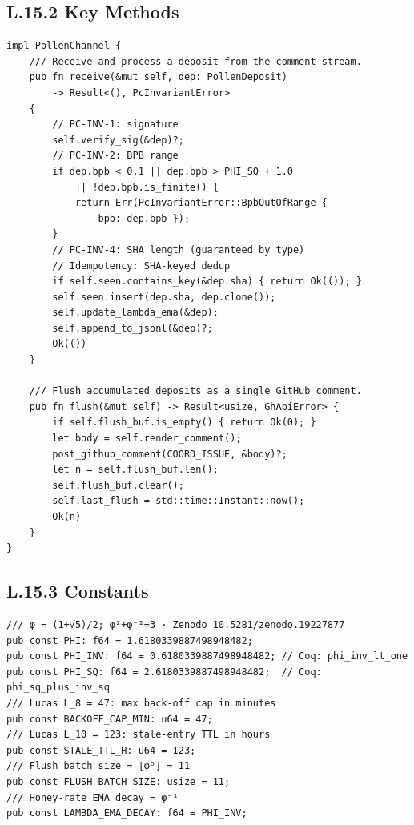 \subsection*{L.15.2 \quad Key Methods}

\begin{verbatim}
impl PollenChannel {
    /// Receive and process a deposit from the comment stream.
    pub fn receive(&mut self, dep: PollenDeposit)
        -> Result<(), PcInvariantError>
    {
        // PC-INV-1: signature
        self.verify_sig(&dep)?;
        // PC-INV-2: BPB range
        if dep.bpb < 0.1 || dep.bpb > PHI_SQ + 1.0
            || !dep.bpb.is_finite() {
            return Err(PcInvariantError::BpbOutOfRange {
                bpb: dep.bpb });
        }
        // PC-INV-4: SHA length (guaranteed by type)
        // Idempotency: SHA-keyed dedup
        if self.seen.contains_key(&dep.sha) { return Ok(()); }
        self.seen.insert(dep.sha, dep.clone());
        self.update_lambda_ema(&dep);
        self.append_to_jsonl(&dep)?;
        Ok(())
    }

    /// Flush accumulated deposits as a single GitHub comment.
    pub fn flush(&mut self) -> Result<usize, GhApiError> {
        if self.flush_buf.is_empty() { return Ok(0); }
        let body = self.render_comment();
        post_github_comment(COORD_ISSUE, &body)?;
        let n = self.flush_buf.len();
        self.flush_buf.clear();
        self.last_flush = std::time::Instant::now();
        Ok(n)
    }
}
\end{verbatim}

\subsection*{L.15.3 \quad Constants}

\begin{verbatim}
/// φ = (1+√5)/2; φ²+φ⁻²=3 · Zenodo 10.5281/zenodo.19227877
pub const PHI: f64 = 1.6180339887498948482;
pub const PHI_INV: f64 = 0.6180339887498948482; // Coq: phi_inv_lt_one
pub const PHI_SQ: f64 = 2.6180339887498948482;  // Coq: phi_sq_plus_inv_sq
/// Lucas L_8 = 47: max back-off cap in minutes
pub const BACKOFF_CAP_MIN: u64 = 47;
/// Lucas L_10 = 123: stale-entry TTL in hours
pub const STALE_TTL_H: u64 = 123;
/// Flush batch size = ⌊φ⁵⌋ = 11
pub const FLUSH_BATCH_SIZE: usize = 11;
/// Honey-rate EMA decay = φ⁻¹
pub const LAMBDA_EMA_DECAY: f64 = PHI_INV;
\end{verbatim}

